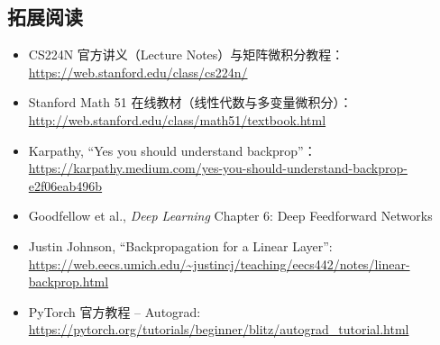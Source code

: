 \documentclass[a4paper]{article}
\begin{document}
\subsection{拓展阅读}

\begin{itemize}
    \item CS224N 官方讲义（Lecture Notes）与矩阵微积分教程：\url{https://web.stanford.edu/class/cs224n/}
    \item Stanford Math 51 在线教材（线性代数与多变量微积分）：\url{http://web.stanford.edu/class/math51/textbook.html}
    \item Karpathy, ``Yes you should understand backprop''：\url{https://karpathy.medium.com/yes-you-should-understand-backprop-e2f06eab496b}
    \item Goodfellow et al., \textit{Deep Learning} Chapter 6: Deep Feedforward Networks
    \item Justin Johnson, ``Backpropagation for a Linear Layer'': \url{https://web.eecs.umich.edu/~justincj/teaching/eecs442/notes/linear-backprop.html}
    \item PyTorch 官方教程 -- Autograd: \url{https://pytorch.org/tutorials/beginner/blitz/autograd_tutorial.html}
\end{itemize}
\end{document}
